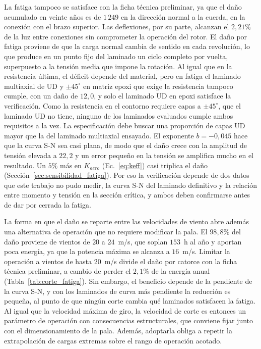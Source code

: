 La fatiga tampoco se satisface con la ficha técnica preliminar, ya que el daño acumulado en veinte años es de $1\,249$ en la dirección normal a la cuerda, en la conexión con el brazo superior. Las deflexiones, por su parte, alcanzan el $2{,}21\%$ de la luz entre conexiones sin comprometer la operación del rotor. El daño por fatiga proviene de que la carga normal cambia de sentido en cada revolución, lo que produce en un punto fijo del laminado un ciclo completo por vuelta, superpuesto a la tensión media que impone la rotación. Al igual que en la resistencia última, el déficit depende del material, pero en fatiga el laminado multiaxial de UD y $\pm 45^\circ$ en matriz epoxi que exige la resistencia tampoco cumple, con un daño de $12{,}0$, y solo el laminado UD en epoxi satisface la verificación. Como la resistencia en el contorno requiere capas a $\pm 45^\circ$, que el laminado UD no tiene, ninguno de los laminados evaluados cumple ambos requisitos a la vez. La especificación debe buscar una proporción de capas UD mayor que la del laminado multiaxial ensayado. El exponente $b = -0{,}045$ hace que la curva S-N sea casi plana, de modo que el daño crece con la amplitud de tensión elevada a $22{,}2$ y un error pequeño en la tensión se amplifica mucho en el resultado. Un $5\%$ más en $K_{aero}$ (Ec.~\ref{eq:keff}) casi triplica el daño (Sección~\ref{sec:sensibilidad_fatiga}). Por eso la verificación depende de dos datos que este trabajo no pudo medir, la curva S-N del laminado definitivo y la relación entre momento y tensión en la sección crítica, y ambos deben confirmarse antes de dar por cerrada la fatiga.

La forma en que el daño se reparte entre las velocidades de viento abre además una alternativa de operación que no requiere modificar la pala. El $98{,}8\%$ del daño proviene de vientos de $20$ a $24$~m/s, que soplan $153$~h al año y aportan poca energía, ya que la potencia máxima se alcanza a $16$~m/s. Limitar la operación a vientos de hasta $20$~m/s divide el daño por catorce con la ficha técnica preliminar, a cambio de perder el $2{,}1\%$ de la energía anual (Tabla~\ref{tab:corte_fatiga}). Sin embargo, el beneficio depende de la pendiente de la curva S-N, y con los laminados de curva más pendiente la reducción es pequeña, al punto de que ningún corte cambia qué laminados satisfacen la fatiga. Al igual que la velocidad máxima de giro, la velocidad de corte es entonces un parámetro de operación con consecuencias estructurales, que conviene fijar junto con el dimensionamiento de la pala. Además, adoptarla obliga a repetir la extrapolación de cargas extremas sobre el rango de operación acotado.

